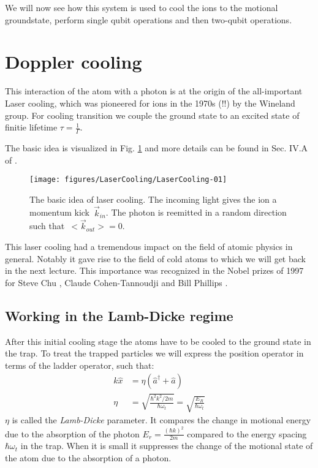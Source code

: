 \documentclass[10pt]{article}
\let\cite\citep
\providecommand\citep{\cite}
\begin{document}
We will now see how this system is used to cool the ions to the motional groundstate, perform single qubit operations and then two-qubit operations.


\section{Doppler cooling}
This interaction of the atom with a photon is at the origin of the all-important Laser cooling, which was pioneered for ions in the 1970s (!!) by the Wineland group. For cooling transition we couple the ground state to an excited state of finitie lifetime $\tau= \frac{1}{\Gamma}$.

The basic idea is visualized in Fig. \ref{960763} and more details can be found in Sec. IV.A of \cite{Leibfried_2003}.
\begin{figure}[h!]
\begin{center}
\texttt{[image: figures/LaserCooling/LaserCooling-01]}
\caption{{The basic idea of laser cooling. The incoming light gives the ion a
momentum kick~\(\vec{k}_{in}\). The photon is reemitted in a random
direction such that~\(<\vec{k}_{out}>=0\).
{\label{960763}}%
}}
\end{center}
\end{figure}

This laser cooling had a tremendous impact on the field of atomic physics in general. Notably it gave rise to the field of cold atoms to which we will get back in the next lecture. This importance was recognized in the Nobel prizes of 1997 for Steve Chu \cite{Chu_1998}, Claude Cohen-Tannoudji \cite{Cohen_Tannoudji_1998} and Bill Phillips \cite{Phillips_1998}. 





\subsection{Working in the Lamb-Dicke regime}
After this initial cooling stage the atoms have to be cooled to the ground state in the trap. To treat the trapped particles we will express the position operator in terms of the ladder operator, such that:
\begin{align}
k\hat{x} &= \eta (\hat{a}^\dag+ \hat{a})\\
\eta &= \sqrt{\frac{\hbar^2 k^2/2m}{\hbar \omega_t}} =\sqrt{\frac{E_R}{\hbar \omega_t}}
\end{align}
$\eta$ is called the \textit{Lamb-Dicke} parameter. It compares the change in motional energy due to the absorption of the photon $E_r = \frac{(\hbar k)^2}{2m}$ compared to the energy spacing $\hbar \omega_t$ in the trap. When it is small it suppresses the change of the motional state of the atom due to the absorption of a photon. 
\end{document}

